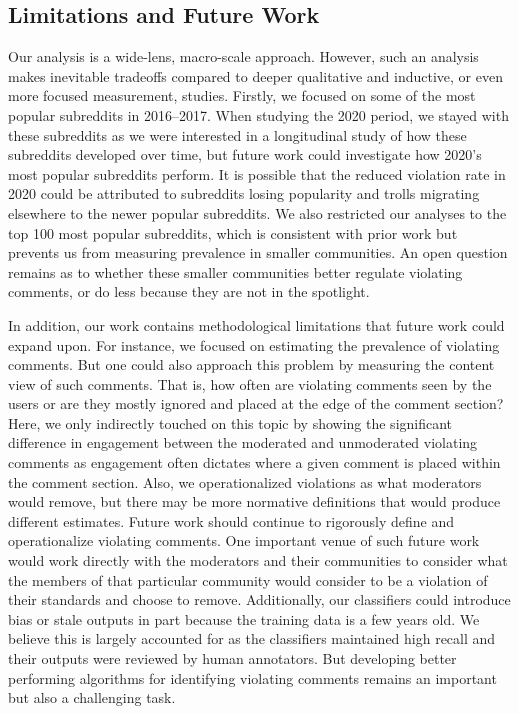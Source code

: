 \subsection{Limitations and Future Work}
Our analysis is a wide-lens, macro-scale approach. However, such an analysis makes inevitable tradeoffs compared to deeper qualitative and inductive, or even more focused measurement, studies. Firstly, we focused on some of the most popular subreddits in 2016--2017. When studying the 2020 period, we stayed with these subreddits as we were interested in a longitudinal study of how these subreddits developed over time, but future work could investigate how 2020's most popular subreddits perform. It is possible that the reduced violation rate in 2020 could be attributed to subreddits losing popularity and trolls migrating elsewhere to the newer popular subreddits. We also restricted our analyses to the top 100 most popular subreddits, which is consistent with prior work but prevents us from measuring prevalence in smaller communities. An open question remains as to whether these smaller communities better regulate violating comments, or do less because they are not in the spotlight. 

In addition, our work contains methodological limitations that future work could expand upon. For instance, we focused on estimating the prevalence of violating comments. But one could also approach this problem by measuring the content view of such comments. That is, how often are violating comments seen by the users or are they mostly ignored and placed at the edge of the comment section? Here, we only indirectly touched on this topic by showing the significant difference in engagement between the moderated and unmoderated violating comments as engagement often dictates where a given comment is placed within the comment section. Also, we operationalized violations as what moderators would remove, but there may be more normative definitions that would produce different estimates. Future work should continue to rigorously define and operationalize violating comments. One important venue of such future work would work directly with the moderators and their communities to consider what the members of that particular community would consider to be a violation of their standards and choose to remove. Additionally, our classifiers could introduce bias or stale outputs in part because the training data is a few years old. We believe this is largely accounted for as the classifiers maintained high recall and their outputs were reviewed by human annotators. But developing better performing algorithms for identifying violating comments remains an important but also a challenging task. 

